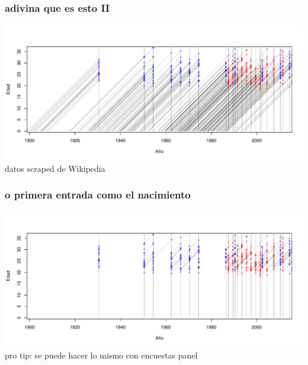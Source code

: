 \documentclass[20pt]{beamer}
\begin{document}
\begin{frame}
\frametitle{adivina que es esto II}
\includegraphics[scale=.88]{Figures/LexisPlayers1.pdf}\\
datos scraped de Wikipedia
\end{frame}

\begin{frame}
\frametitle{o primera entrada como el nacimiento}
\includegraphics[scale=.88]{Figures/LexisPlayers2.pdf}\\
pro tip: se puede hacer lo mismo con encuestas panel
\end{frame}

\end{document}
